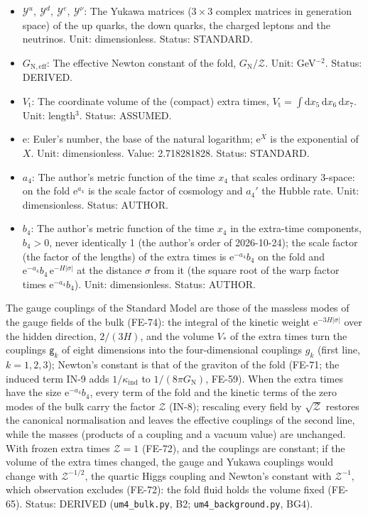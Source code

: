 \documentclass[
  10pt,
]{article}
\begin{document}
\begin{itemize}
  Unit: dimensionless. Status: DERIVED.
\item
  \(\mathcal{Y}^{u},\ \mathcal{Y}^{d},\ \mathcal{Y}^{e},\ \mathcal{Y}^{\nu}\):
  The Yukawa matrices (\(3 \times 3\) complex matrices in generation
  space) of the up quarks, the down quarks, the charged leptons and the
  neutrinos. Unit: dimensionless. Status: STANDARD.
\item
  \(G_{\mathrm{N,eff}}\): The effective Newton constant of the fold,
  \(G_{\mathrm{N}}/\mathcal{Z}\). Unit: GeV\(^{-2}\). Status: DERIVED.
\item
  \(V_{\mathrm{t}}\): The coordinate volume of the (compact) extra
  times,
  \(V_{\mathrm{t}} = \int\mathrm{d}x_5\,\mathrm{d}x_6\,\mathrm{d}x_7\).
  Unit: length\(^3\). Status: ASSUMED.
\item
  \(\mathrm{e}\): Euler's number, the base of the natural logarithm;
  \(\mathrm{e}^{X}\) is the exponential of \(X\). Unit: dimensionless.
  Value: 2.718281828. Status: STANDARD.
\item
  \(a_4\): The author's metric function of the time \(x_4\) that scales
  ordinary 3-space: on the fold \(\mathrm{e}^{a_4}\) is the scale factor
  of cosmology and \(a_4'\) the Hubble rate. Unit: dimensionless.
  Status: AUTHOR.
\item
  \(b_4\): The author's metric function of the time \(x_4\) in the
  extra-time components, \(b_4 > 0\), never identically 1 (the author's
  order of 2026-10-24); the scale factor (the factor of the lengths) of
  the extra times is \(\mathrm{e}^{-a_4}b_4\) on the fold and
  \(\mathrm{e}^{-a_4}b_4\,\mathrm{e}^{-H\lvert\sigma\rvert}\) at the
  distance \(\sigma\) from it (the square root of the warp factor times
  \(\mathrm{e}^{-a_4}b_4\)). Unit: dimensionless. Status: AUTHOR.
\end{itemize}

The gauge couplings of the Standard Model are those of the massless
modes of the gauge fields of the bulk (FE-74): the integral of the
kinetic weight \(\mathrm{e}^{-3H\lvert\sigma\rvert}\) over the hidden
direction, \(2/(3H)\), and the volume \(V_*\) of the extra times turn
the couplings \(\mathsf{g}_k\) of eight dimensions into the
four-dimensional couplings \(g_k\) (first line, \(k = 1, 2, 3\));
Newton's constant is that of the graviton of the fold (FE-71; the
induced term IN-9 adds \(1/\kappa_{\mathrm{ind}}\) to
\(1/(8\pi G_{\mathrm{N}})\), FE-59). When the extra times have the size
\(\mathrm{e}^{-a_4}b_4\), every term of the fold and the kinetic terms
of the zero modes of the bulk carry the factor \(\mathcal{Z}\) (IN-8);
rescaling every field by \(\sqrt{\mathcal{Z}}\) restores the canonical
normalisation and leaves the effective couplings of the second line,
while the masses (products of a coupling and a vacuum value) are
unchanged. With frozen extra times \(\mathcal{Z} = 1\) (FE-72), and the
couplings are constant; if the volume of the extra times changed, the
gauge and Yukawa couplings would change with \(\mathcal{Z}^{-1/2}\), the
quartic Higgs coupling and Newton's constant with \(\mathcal{Z}^{-1}\),
which observation excludes (FE-72): the fold fluid holds the volume
fixed (FE-65). Status: DERIVED (\texttt{um4\_bulk.py}, B2;
\texttt{um4\_background.py}, BG4).
\end{document}
